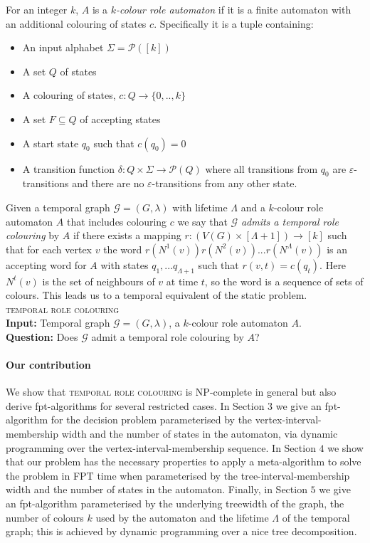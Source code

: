 \documentclass[runningheads]{llncs}
\begin{document}
 
\begin{definition}
For an integer $k$,
$A$ is a \emph{$k$-colour role automaton} if it is a finite automaton with an additional colouring of states $c$. Specifically it is a tuple containing:
\begin{itemize}
    \item An input alphabet $\Sigma =\mathcal{P}([k])$
    \item A set $Q$ of states
    \item A colouring of states, $c:Q\to \{0,..,k\}$
    \item A set $F \subseteq Q$ of accepting states
    \item A start state $q_0$ such that $c(q_0)=0$
    \item A transition function $\delta: Q \times \Sigma \rightarrow \mathcal{P}(Q)$ where all transitions from $q_0$ are $\varepsilon$-transitions and there are no $\varepsilon$-transitions from any other state.
\end{itemize}
\end{definition}
Given a temporal graph $\mathcal{G}=(G,\lambda)$ with lifetime $\Lambda$ and a $k$-colour role automaton $A$ that includes colouring $c$ we say that $\mathcal{G}$ \textit{admits a temporal role colouring} by $A$ if there exists a mapping $r:(V(G)\times [\Lambda+1])\rightarrow [k]$ such that for each vertex $v$ the word $ r(N^1(v))r(N^2(v))...r(N^\Lambda(v))$ is an accepting word for $A$ with states $q_1,...q_{\Lambda+1}$ such that $r(v,t)=c(q_t)$. Here $N^t(v)$ is the set of neighbours of $v$ at time $t$, so the word is a sequence of sets of colours. 
This leads us to a temporal equivalent of the static problem.\\


\noindent
\textsc{temporal role colouring}\\
\textbf{Input:} Temporal graph $\mathcal{G}=(G,\lambda)$, a $k$-colour role automaton $A$.\\
\textbf{Question:} Does $\mathcal{G}$ admit a temporal role colouring by $A$?\\


\paragraph{Our contribution}
We show that \textsc{temporal role colouring} is NP-complete in general but also derive fpt-algorithms for several restricted cases. 
In Section $3$ we give an fpt-algorithm for the decision problem parameterised by the vertex-interval-membership width and the number of states in the automaton, via dynamic programming over the vertex-interval-membership sequence.
In Section $4$ we show that our problem has the necessary properties to apply a meta-algorithm to solve the problem in FPT time when parameterised by the tree-interval-membership width and the number of states in the automaton.
Finally, in Section $5$ we give an fpt-algorithm parameterised by the underlying treewidth of the graph, the number of colours $k$ used by the automaton and the lifetime $\Lambda$ of the temporal graph; this is achieved by dynamic programming over a nice tree decomposition.
\end{document}
